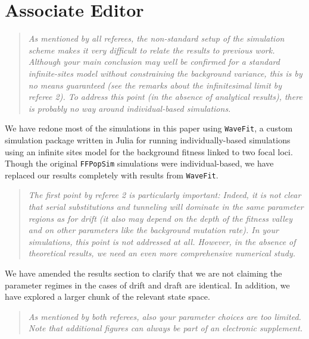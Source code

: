 \documentclass[11pt]{article}
\newenvironment{reviewerquote}{\begin{quote}\color{black}\itshape}{\end{quote}}
\begin{document}
\section*{Associate Editor}

\begin{reviewerquote}
As mentioned by all referees, the non-standard setup of the simulation scheme makes it very difficult to relate the results to previous work. Although your main conclusion may well be confirmed for a standard infinite-sites model without constraining the background variance, this is by no means guaranteed (see the remarks about the infinitesimal limit by referee 2). To address this point (in the absence of analytical results), there is probably no way around individual-based simulations.
\end{reviewerquote}

We have redone most of the simulations in this paper using \texttt{WaveFit}, a custom simulation package written in Julia for running individually-based simulations using an infinite sites model for the background fitness linked to two focal loci. Though the original \texttt{FFPopSim} simulations were individual-based, we have replaced our results completely with results from \texttt{WaveFit}.

\begin{reviewerquote}
The first point by referee 2 is particularly important: Indeed, it is not clear that serial substitutions and tunneling will dominate in the same parameter regions as for drift (it also may depend on the depth of the fitness valley and on other parameters like the background mutation rate). In your simulations, this point is not addressed at all. However, in the absence of theoretical results, we need an even more comprehensive numerical study.
\end{reviewerquote}

We have amended the results section to clarify that we are not claiming the parameter regimes in the cases of drift and draft are identical. In addition, we have explored a larger chunk of the relevant state space.

\begin{reviewerquote}
As mentioned by both referees, also your parameter choices are too limited. Note that additional figures can always be part of an electronic supplement.
\end{reviewerquote}
\end{document}
